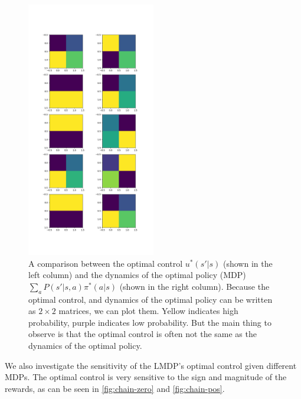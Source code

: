 \begin{figure}[h!]
\centering
\includegraphics[width=0.5\textwidth,height=0.75\textheight]{../../pictures/figures/lmdp_mdp_optimal_dynamics.png}
\caption{A comparison between the optimal control $u^{* }(s'|s)$ (shown in the left column) and the dynamics of the optimal policy (MDP) $\sum_a P(s'|s, a)\pi^{* }(a|s)$ (shown in the right column). Because the optimal control, and dynamics of the optimal policy can be written as $2\times 2$ matrices, we can plot them. Yellow indicates high probability, purple indicates low probability. But the main thing to observe is that the optimal control is often not the same as the dynamics of the optimal policy.}
\label{fig:opt-control}
\end{figure}

We also investigate the sensitivity of the LMDP's optimal control given different MDPs.
The optimal control is very sensitive to the sign and magnitude of the rewards, as can be seen in \ref{fig:chain-zero} and \ref{fig:chain-pos}.

